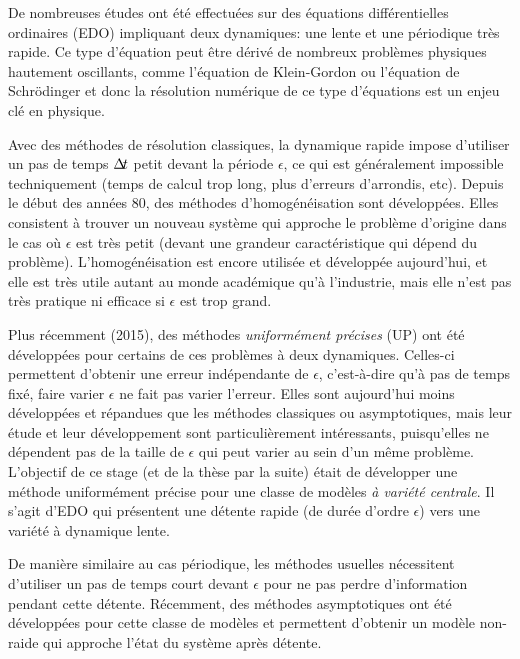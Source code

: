 
De nombreuses études ont été effectuées sur des équations différentielles ordinaires (EDO) impliquant deux dynamiques: une lente et une périodique très rapide. 
Ce type d'équation peut être dérivé de nombreux problèmes physiques hautement oscillants, comme l'équation de Klein-Gordon ou l'équation de Schrödinger\cite{chartier2015UA} et donc la résolution numérique de ce type d'équations est un enjeu clé en physique. 

Avec des méthodes de résolution classiques, la dynamique rapide impose d'utiliser un pas de temps $\Delta\!\!\!\ t$ petit devant la période $\epsilon$, ce qui est généralement impossible techniquement (temps de calcul trop long, plus d'erreurs d'arrondis, etc). 
Depuis le début des années 80, des méthodes d'homogénéisation \cite[\textit{sec}. I.2]{bensoussan_homog} sont développées. 
Elles consistent à trouver un nouveau système qui approche le problème d'origine dans le cas où $\epsilon$ est très petit (devant une grandeur caractéristique qui dépend du problème). 
L'homogénéisation est encore utilisée et développée aujourd'hui, et elle est très utile autant au monde académique qu'à l'industrie, mais elle n'est pas très pratique ni efficace si $\epsilon$ est trop grand. 

Plus récemment (2015), des méthodes \textit{uniformément précises} (UP)\cite{chartier2015UA,chartier2018micromacro} ont été développées pour certains de ces problèmes à deux dynamiques. 
Celles-ci permettent d'obtenir une erreur indépendante de $\epsilon$, c'est-à-dire qu'à pas de temps fixé, faire varier $\epsilon$ ne fait pas varier l'erreur. 
Elles sont aujourd'hui moins développées et répandues que les méthodes classiques ou asymptotiques, mais leur étude et leur développement sont particulièrement intéressants, puisqu'elles ne dépendent pas de la taille de $\epsilon$ qui peut varier au sein d'un même problème. \\


L'objectif de ce stage (et de la thèse par la suite) était de développer une méthode uniformément précise pour une classe de modèles \textit{à variété centrale}. 
Il s'agit d'EDO qui présentent une détente rapide (de durée d'ordre $\epsilon$) vers une variété à dynamique lente. 

De manière similaire au cas périodique, les méthodes usuelles nécessitent d'utiliser un pas de temps court devant $\epsilon$ pour ne pas perdre d'information pendant cette détente. 
Récemment, des méthodes asymptotiques ont été développées pour cette classe de modèles\cite{castella2016formal} et permettent d'obtenir un modèle non-raide qui approche l'état du système après détente. 

